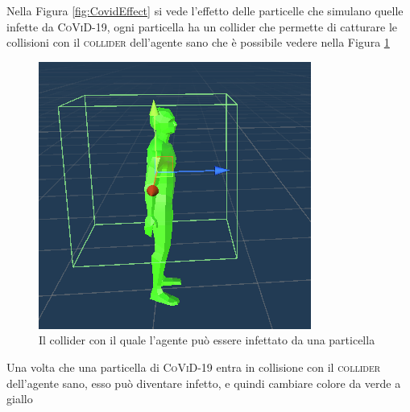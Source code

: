 \documentclass[12pt, openany]{book}
\begin{document}
Nella Figura \ref{fig:CovidEffect} si vede l'effetto delle particelle che simulano quelle infette da \textsc{CoViD-19}, ogni particella ha un collider che permette di catturare le collisioni con il \textsc{collider} dell'agente sano che è possibile vedere nella Figura \ref{fig:ColliderCovid}
\begin{figure}[H]
	\centering
	\includegraphics[width=0.5\linewidth]{"Immagini/ColliderCovid.png"}
	\caption{Il collider con il quale l'agente può essere infettato da una particella}
	\label{fig:ColliderCovid}
\end{figure}
Una volta che una particella di \textsc{CoViD-19} entra in collisione con il \textsc{collider} dell'agente sano, esso può diventare infetto, e quindi cambiare colore da verde a giallo
\end{document}
